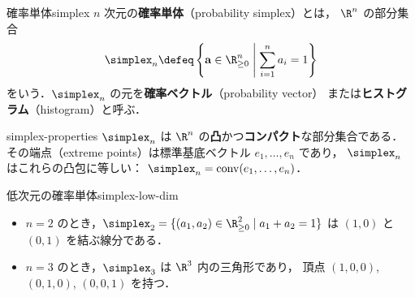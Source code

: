 \begin{definition}{確率単体}{simplex}
  $n$ 次元の\textbf{確率単体}（probability simplex）とは，
  $\R^n$ の部分集合
  \[
    \simplex_n \defeq
    \left\{ \mathbf{a} \in \R_{\geq 0}^n \;\middle|\; \sum_{i=1}^n a_i = 1 \right\}
  \]
  をいう．$\simplex_n$ の元を\textbf{確率ベクトル}（probability vector）
  または\textbf{ヒストグラム}（histogram）と呼ぶ．
\end{definition}

\begin{remark}{}{simplex-properties}
  $\simplex_n$ は $\R^n$ の\textbf{凸}かつ\textbf{コンパクト}な部分集合である．
  その端点（extreme points）は標準基底ベクトル $e_1, \ldots, e_n$ であり，
  $\simplex_n$ はこれらの凸包に等しい：
  $\simplex_n = \operatorname{conv}(e_1, \ldots, e_n)$．
\end{remark}

\begin{example}{低次元の確率単体}{simplex-low-dim}
  \begin{itemize}
    \item $n = 2$ のとき，$\simplex_2 = \{(a_1, a_2) \in \R_{\geq 0}^2 \mid a_1 + a_2 = 1\}$
      は $(1, 0)$ と $(0, 1)$ を結ぶ線分である．
    \item $n = 3$ のとき，$\simplex_3$ は $\R^3$ 内の三角形であり，
      頂点 $(1,0,0)$, $(0,1,0)$, $(0,0,1)$ を持つ．
  \end{itemize}

  \begin{center}
  \end{center}
\end{example}

